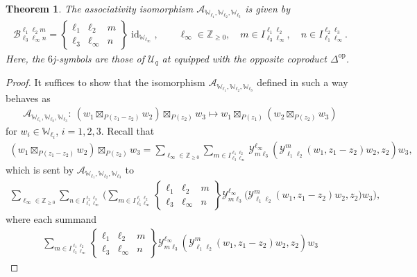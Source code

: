 \documentclass[10pt,a4paper]{amsart}
\numberwithin{equation}{section}
\newtheorem{thm}{Theorem}[section]
\newcommand{\id}{\operatorname{id}}
\newcommand{\op}{\mathrm{op}}
\newcommand{\bZ}{\mathbb{Z}}
\newcommand{\cA}{\mathcal{A}}
\newcommand{\cB}{\mathcal{B}}
\newcommand{\cU}{\mathcal{U}}
\newcommand{\bbmi}{\mathbbm{i}}
\newcommand{\UEA}{\cU}
\newcommand{\Uq}{\UEA_{q}}
\newcommand{\QGcoprod}{\Delta}
\newcommand{\sixjsymb}[6]{
\left\{
\begin{array}{ccc}
 #1 & #2 & #5 \\
 #3 & #4 & #6
\end{array}
\right\}
}
\newcommand{\ascmtx}[6]{\cB^{#1 #2 #5}_{#3 #4 #6}}
\newcommand{\Chan}[4]{I^{#1 #2}_{#3 #4}}
\newcommand{\voaint}{\mathcal{Y}}
\newcommand{\vmodvec}{w}
\newcommand{\virmod}{\mathbb{W}}
\begin{document}
\begin{thm}
\label{thm:assoc_6j}
The associativity isomorphism $\cA_{\virmod_{\ell_{1}},\virmod_{\ell_{2}},\virmod_{\ell_{3}}}$ is given by
\begin{gather*}
 \ascmtx{\ell_{1}}{\ell_{2}}{\ell_{3}}{\ell_{\infty}}{m}{n}=\sixjsymb{\ell_{1}}{\ell_{2}}{\ell_{3}}{\ell_{\infty}}{m}{n}\id_{\virmod_{\ell_{\infty}}},\qquad \ell_{\infty}\in\bZ_{\geq 0}, \quad m\in \Chan{\ell_{1}}{\ell_{2}}{\ell_{3}}{\ell_{\infty}}, \quad n\in \Chan{\ell_{2}}{\ell_{3}}{\ell_{1}}{\ell_{\infty}}.
\end{gather*}
Here, the $6$j-symbols are those of $\Uq$ at \smash{$q={\rm e}^{\pi\bbmi t}$} equipped with the opposite coproduct $\QGcoprod^{\op}$.
\end{thm}
\begin{proof}
It suffices to show that the isomorphism $\cA_{\virmod_{\ell_{1}},\virmod_{\ell_{2}},\virmod_{\ell_{3}}}$ defined in such a way behaves as
\begin{gather*}
 \cA_{\virmod_{\ell_{1}},\virmod_{\ell_{2}},\virmod_{\ell_{3}}}\colon\ (\vmodvec_{1}\boxtimes_{P(z_{1}-z_{2})}\vmodvec_{2})\boxtimes_{P(z_{2})}\vmodvec_{3}\mapsto \vmodvec_{1}\boxtimes_{P(z_{1})}(\vmodvec_{2}\boxtimes_{P(z_{2})}\vmodvec_{3})
\end{gather*}
for $\vmodvec_{i}\in\virmod_{\ell_{i}}$, $i=1,2,3$.
Recall that
\begin{gather*}
 (\vmodvec_{1}\boxtimes_{P(z_{1}-z_{2})}\vmodvec_{2})\boxtimes_{P(z_{2})}\vmodvec_{3}=\sum_{\ell_{\infty}\in\bZ_{\geq 0}}\sum_{m\in \Chan{\ell_{1}}{\ell_{2}}{\ell_{3}}{\ell_{\infty}}}\voaint_{m \ell_{3}}^{\ell_{\infty}}(\voaint_{\ell_{1} \ell_{2}}^{m}(\vmodvec_{1},z_{1}-z_{2})\vmodvec_{2},z_{2})\vmodvec_{3},
\end{gather*}
which is sent by $\cA_{\virmod_{\ell_{1}},\virmod_{\ell_{2}},\virmod_{\ell_{3}}}$ to
\begin{align}
\label{eq:associativity_computation_intermediate}
 \sum_{\ell_{\infty}\in\bZ_{\geq 0}}\sum_{n\in \Chan{\ell_{2}}{\ell_{3}}{\ell_{1}}{\ell_{\infty}}}\bigg(\sum_{m\in \Chan{\ell_{1}}{\ell_{2}}{\ell_{3}}{\ell_{\infty}}}\sixjsymb{\ell_{1}}{\ell_{2}}{\ell_{3}}{\ell_{\infty}}{m}{n}\voaint_{m \ell_{3}}^{\ell_{\infty}}\bigg(\voaint_{\ell_{1} \ell_{2}}^{m}(\vmodvec_{1},z_{1}-z_{2})\vmodvec_{2},z_{2}\bigg)\vmodvec_{3}\bigg),
\end{align}
where each summand
\begin{gather*}
 \sum_{m\in \Chan{\ell_{1}}{\ell_{2}}{\ell_{3}}{\ell_{\infty}}}\sixjsymb{\ell_{1}}{\ell_{2}}{\ell_{3}}{\ell_{\infty}}{m}{n}\voaint_{m \ell_{3}}^{\ell_{\infty}}(\voaint_{\ell_{1} \ell_{2}}^{m}(\vmodvec_{1},z_{1}-z_{2})\vmodvec_{2},z_{2})\vmodvec_{3}

\end{gather*}
\end{proof}
\end{document}
